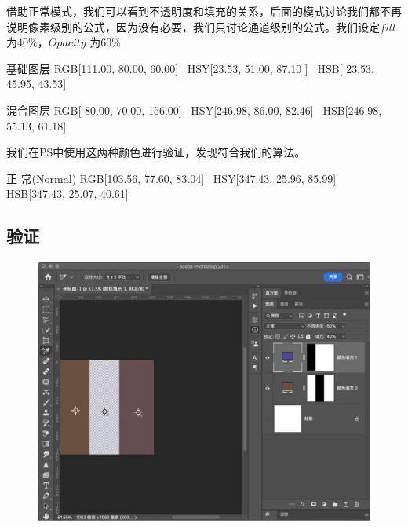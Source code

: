 借助正常模式，我们可以看到不透明度和填充的关系，后面的模式讨论我们都不再说明像素级别的公式，因为没有必要，我们只讨论通道级别的公式。我们设定$fill$为$40\%$，$Opacity$ 为$60\%$
\begin{notice}
	\item 基础图层                RGB[111.00,  80.00,  60.00]~ HSY[23.53,  51.00,  87.10 ]~ HSB[ 23.53,  45.95,  43.53]
	
	\item 混合图层                RGB[ 80.00,  70.00, 156.00]~ HSY[246.98,  86.00,  82.46]~ HSB[246.98,  55.13,  61.18]
\end{notice}

我们在PS中使用这两种颜色进行验证，发现符合我们的算法。
\begin{result}
	\item 正    常(Normal)        RGB[103.56,  77.60,  83.04]~ HSY[347.43,  25.96,  85.99]~ HSB[347.43,  25.07,  40.61]
\end{result}
\newpage
\subsection{ 验证}
\begin{figure}[h!]
	\centering
	\includegraphics[width=\linewidth]{figure/normal}
	\caption{}
	\label{fig:normal}
\end{figure}
\newpage
